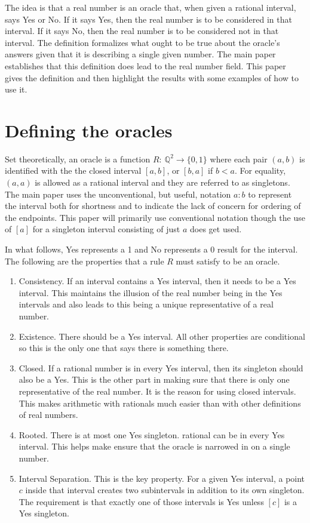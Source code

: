 \documentclass[12pt]{article}
\theoremstyle{remark}
\begin{document}
The idea is that a real number is an oracle that, when given a rational interval, says Yes or No. If it says Yes, then the real number is to be considered in that interval. If it says No, then the real number is to be considered not in that interval. The definition formalizes what ought to be true about the oracle's answers given that it is describing a single given number. The main paper establishes that this definition does lead to the real number field. This paper gives the definition and then highlight the results with some examples of how to use it. 

\section{Defining the oracles}\label{sec:ora}

Set theoretically, an oracle is a function $R:\ \mathbb{Q}^2 \to \{0,1\}$ where each pair $(a,b)$ is identified with the  the closed interval $[a,b]$, or $[b,a]$ if $b < a$. For equality, $(a,a)$ is allowed as a rational interval and they are referred to as singletons. The main paper uses the unconventional, but useful, notation $a:b$ to represent the interval both for shortness and to indicate the lack of concern for ordering of the endpoints. This paper will primarily use conventional notation though the use of $[a]$ for a singleton interval consisting of just $a$ does get used. 

In what follows, Yes represents a 1 and No represents a 0 result for the interval. The following are the properties that a rule $R$ must satisfy to be an oracle. 

\begin{enumerate}
    \item Consistency. If an interval contains a Yes interval, then it needs to be a Yes interval. This maintains the illusion of the real number being in the Yes intervals and also leads to this being a unique representative of a real number. 
    \item Existence. There should be a Yes interval. All other properties are conditional so this is the only one that says there is something there. 
    \item Closed. If a rational number is in every Yes interval, then its singleton should also be a Yes. This is the other part in making sure that there is only one representative of the real number. It is the reason for using closed intervals. This makes arithmetic with rationals much easier than with other definitions of real numbers.
    \item Rooted. There is at most one Yes singleton. rational can be in every Yes interval. This helps make ensure that the oracle is narrowed in on a single number. 
    \item Interval Separation. This is the key property. For a given Yes interval, a point $c$ inside that interval creates two subintervals in addition to its own singleton. The requirement is that exactly one of those intervals is Yes unless $[c]$ is a Yes singleton. 
\end{enumerate}
\end{document}
